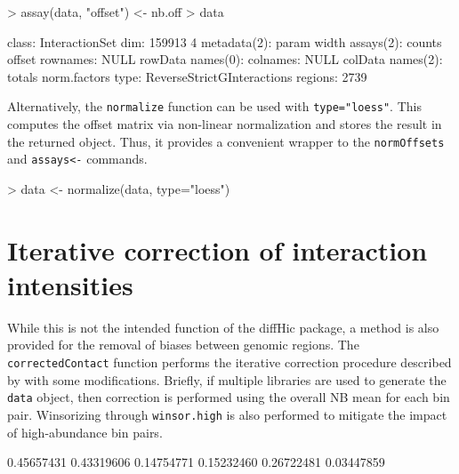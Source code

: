 \documentclass[12pt]{report}
\renewenvironment{Schunk}{\vspace{0pt}}{\vspace{0pt}}
\newcommand{\pkgname}{diffHic}
\newcommand{\code}[1]{{\small\texttt{#1}}}
\begin{document}
\begin{Schunk}
\begin{Sinput}
> assay(data, "offset") <- nb.off
> data
\end{Sinput}
\begin{Soutput}
class: InteractionSet 
dim: 159913 4 
metadata(2): param width
assays(2): counts offset
rownames: NULL
rowData names(0):
colnames: NULL
colData names(2): totals norm.factors
type: ReverseStrictGInteractions
regions: 2739
\end{Soutput}
\end{Schunk}

Alternatively, the \code{normalize} function can be used with \code{type="loess"}.
This computes the offset matrix via non-linear normalization and stores the result in the returned object.
Thus, it provides a convenient wrapper to the \code{normOffsets} and \code{assays<-} commands. 

\begin{Schunk}
\begin{Sinput}
> data <- normalize(data, type="loess")
\end{Sinput}
\end{Schunk}

\section{Iterative correction of interaction intensities}
\label{sec:itercor}
While this is not the intended function of the \pkgname{} package, a method is also provided for the removal of biases between genomic regions.
The \code{correctedContact} function performs the iterative correction procedure described by \cite{imakaev2012iterative} with some modifications.
Briefly, if multiple libraries are used to generate the \code{data} object, then correction is performed using the overall NB mean for each bin pair.
Winsorizing through \code{winsor.high} is also performed to mitigate the impact of high-abundance bin pairs.

\begin{Schunk}
\begin{Soutput}
[1] 0.45657431 0.43319606 0.14754771 0.15232460 0.26722481 0.03447859
\end{Soutput}
\end{Schunk}
\end{document}
